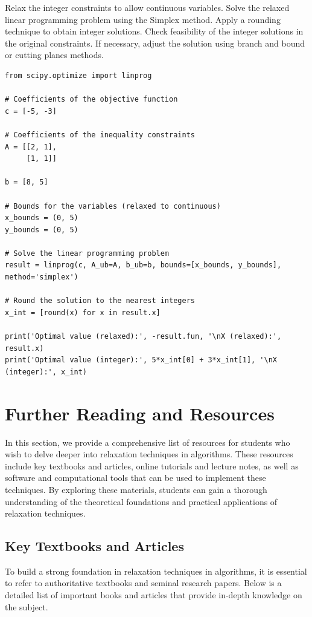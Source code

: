 \documentclass[12pt]{book} %
\begin{document}
\begin{algorithm}
\caption{Integer Programming Relaxation}
\begin{algorithmic}[1]
\State Relax the integer constraints to allow continuous variables.
\State Solve the relaxed linear programming problem using the Simplex method.
\State Apply a rounding technique to obtain integer solutions.
\State Check feasibility of the integer solutions in the original constraints.
\State If necessary, adjust the solution using branch and bound or cutting planes methods.
\end{algorithmic}
\end{algorithm}

\FloatBarrier

\begin{lstlisting}
from scipy.optimize import linprog

# Coefficients of the objective function
c = [-5, -3]

# Coefficients of the inequality constraints
A = [[2, 1],
     [1, 1]]

b = [8, 5]

# Bounds for the variables (relaxed to continuous)
x_bounds = (0, 5)
y_bounds = (0, 5)

# Solve the linear programming problem
result = linprog(c, A_ub=A, b_ub=b, bounds=[x_bounds, y_bounds], method='simplex')

# Round the solution to the nearest integers
x_int = [round(x) for x in result.x]

print('Optimal value (relaxed):', -result.fun, '\nX (relaxed):', result.x)
print('Optimal value (integer):', 5*x_int[0] + 3*x_int[1], '\nX (integer):', x_int)
\end{lstlisting}

\FloatBarrier


\section{Further Reading and Resources}
In this section, we provide a comprehensive list of resources for students who wish to delve deeper into relaxation techniques in algorithms. These resources include key textbooks and articles, online tutorials and lecture notes, as well as software and computational tools that can be used to implement these techniques. By exploring these materials, students can gain a thorough understanding of the theoretical foundations and practical applications of relaxation techniques.

\subsection{Key Textbooks and Articles}
To build a strong foundation in relaxation techniques in algorithms, it is essential to refer to authoritative textbooks and seminal research papers. Below is a detailed list of important books and articles that provide in-depth knowledge on the subject.
\end{document}
